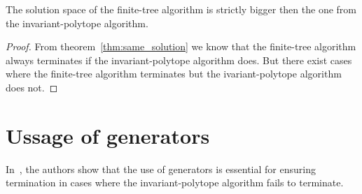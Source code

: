 \begin{theorem}
    The solution space of the finite-tree algorithm is strictly bigger then the one from the invariant-polytope algorithm. 
\end{theorem}

\begin{proof}
    From theorem~\ref{thm:same_solution} we know that the finite-tree algorithm always terminates if the invariant-polytope algorithm does.
    But there exist cases where the finite-tree algorithm terminates but the ivariant-polytope algorithm does not. 
\end{proof}

\section{Ussage of generators}
In~\citep{mollerTreebasedApproachJoint2014}, the authors show that the use of generators is essential for ensuring termination in cases where the invariant-polytope algorithm fails to terminate.

